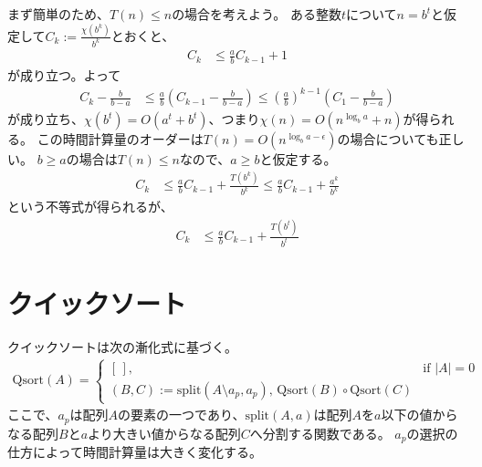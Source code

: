 \documentclass[a4paper,twoside,onecolumn,openany,article,10pt]{memoir}
\theoremstyle{remark}
\begin{document}
まず簡単のため、$T(n)\le n$の場合を考えよう。
ある整数$t$について$n=b^t$と仮定して$C_k := \frac{\chi(b^k)}{b^k}$とおくと、
\begin{align*}
C_k &\le \frac{a}{b} C_{k-1} + 1
\end{align*}
が成り立つ。よって
\begin{align*}
C_k - \frac{b}{b-a} &\le \frac{a}{b} \left(C_{k-1} - \frac{b}{b-a}\right) \le \left(\frac{a}{b}\right)^{k-1}\left(C_1 - \frac{b}{b-a}\right)
\end{align*}
が成り立ち、$\chi(b^t) = O(a^t + b^t)$、つまり$\chi(n) = O(n^{\log_b a} + n)$が得られる。
この時間計算量のオーダーは$T(n) = O(n^{\log_b a - \epsilon})$の場合についても正しい。
$b \ge a$の場合は$T(n)\le n$なので、$a\ge b$と仮定する。
\begin{align*}
C_k &\le \frac{a}{b} C_{k-1} + \frac{T(b^k)}{b^k}
\le \frac{a}{b} C_{k-1} + \frac{a^k}{b^k}
\end{align*}
という不等式が得られるが、
\begin{align*}
C_k &\le \frac{a}{b} C_{k-1} + \frac{T(b^t)}{b^t}
\end{align*}
\fi

\section{クイックソート}
クイックソートは次の漸化式に基づく。
\begin{align*}
\mathrm{Qsort}(A) =
\begin{cases}
[\,],& \text{if } |A| = 0\\
(B, C) := \mathrm{split}(A\setminus a_p, a_p),\, \mathrm{Qsort}(B) \circ \mathrm{Qsort}(C)
\end{cases}
\end{align*}
ここで、$a_p$は配列$A$の要素の一つであり、$\mathrm{split}(A, a)$は配列$A$を$a$以下の値からなる配列$B$と$a$より大きい値からなる配列$C$へ分割する関数である。
$a_p$の選択の仕方によって時間計算量は大きく変化する。
\end{document}
